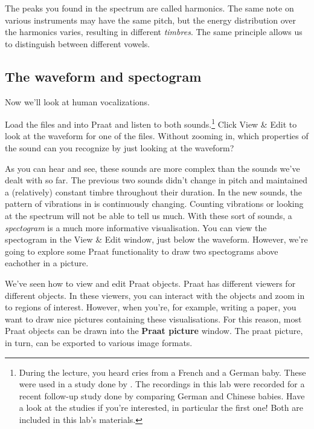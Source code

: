 \documentclass[a4paper, 9pt]{article}
\begin{document}
The peaks you found in the spectrum are called harmonics. The same note
on various instruments may have the same pitch, but the energy
distribution over the harmonics varies, resulting in different
\emph{timbres}. The same principle allows us to distinguish between
different vowels.


\subsection{The waveform and
spectogram}\label{the-waveform-and-spectogram}

Now we'll look at human vocalizations.

\begin{exercise}
\action Load the files  and  into Praat and listen to both sounds.\footnote{During the lecture, you heard cries from a French and a German baby. These were used in a study done by \cite{Mampe2009}. The recordings in this lab were recorded for a recent follow-up study done by \cite{Wermke2016} comparing German and Chinese babies. Have a look at the studies if you're interested, in particular the first one! Both are included in this lab's materials.}
\action Click View \& Edit to look at the waveform for one of the files. Without zooming in, which properties of the sound can you recognize by just looking at the waveform?
\end{exercise}

As you can hear and see, these sounds are more complex than the sounds
we've dealt with so far. The previous two sounds didn't change in pitch
and maintained a (relatively) constant timbre throughout their duration.
In the new sounds, the pattern of vibrations in is continuously
changing. Counting vibrations or looking at the spectrum will not be
able to tell us much. With these sort of sounds, a \emph{spectogram} is
a much more informative visualisation. You can view the spectogram in
the View \& Edit window, just below the waveform. However, we're going
to explore some Praat functionality to draw two spectograms above
eachother in a picture.

We've seen how to view and edit Praat objects. Praat has different
viewers for different objects. In these viewers, you can interact with
the objects and zoom in to regions of interest. However, when you're,
for example, writing a paper, you want to draw nice pictures containing
these visualisations. For this reason, most Praat objects can be drawn
into the \textbf{Praat picture} window. The praat picture, in turn, can
be exported to various image formats.
\end{document}
